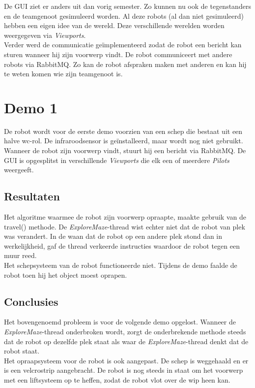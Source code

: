 \documentclass[tt2]{penoverslag}
\begin{document}
De GUI ziet er anders uit dan vorig semester. Zo kunnen nu ook de tegenstanders en de teamgenoot gesimuleerd worden. Al deze robots (al dan niet gesimuleerd) hebben een eigen idee van de wereld. Deze verschillende werelden worden weergegeven via \textit{Viewports}.\\

Verder werd de communicatie ge\"implementeerd zodat de robot een bericht kan sturen wanneer hij zijn voorwerp vindt. 
De robot communiceert met andere robots via RabbitMQ. Zo kan de robot afspraken maken met anderen en kan hij te weten komen wie zijn teamgenoot is.
 


\newpage
\makeappendix

\section{Demo 1} %
\label{Asec:demo1}
De robot wordt voor de eerste demo voorzien van een schep die bestaat uit een halve wc-rol. De infraroodsensor is ge\"installeerd, maar wordt nog niet gebruikt. Wanneer de robot zijn voorwerp vindt, stuurt hij een bericht via RabbitMQ. De GUI is opgesplitst in verschillende \textit{Viewports} die elk een of meerdere \textit{Pilots} weergeeft.

\subsection{Resultaten} %
\label{Assec:result1}
Het algoritme waarmee de robot zijn voorwerp opraapte, maakte gebruik van de travel() methode. De \textit{ExploreMaze}-thread wist echter niet dat de robot van plek was verandert. In de waan dat de robot op een andere plek stond dan in werkelijkheid, gaf de thread verkeerde instructies waardoor de robot tegen een muur reed. \\
Het schepsysteem van de robot functioneerde niet. Tijdens de demo faalde de robot toen hij het object moest oprapen. 

\subsection{Conclusies} %
\label{Assec:conc1}
Het bovengenoemd probleem is voor de volgende demo opgelost. Wanneer de \textit{ExploreMaze}-thread onderbroken wordt, zorgt de onderbrekende methode steeds dat de robot op dezelfde plek staat als waar de \textit{ExploreMaze}-thread denkt dat de robot staat.\\
Het opraapsysteem voor de robot is ook aangepast. De schep is weggehaald en er is een velcrostrip aangebracht. De robot is nog steeds in staat om het voorwerp met een liftsysteem op te heffen, zodat de robot vlot over de wip heen kan.
\end{document}
